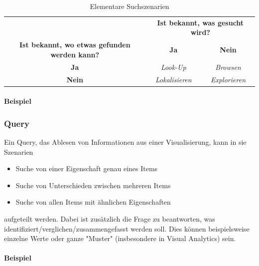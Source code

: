 				\begin{table}
					\centering
					\begin{tabular}{c|cc}
						\toprule
						                                                     & \multicolumn{2}{c}{\textbf{Ist bekannt, was gesucht wird?}} \\
						\textbf{Ist bekannt, wo etwas gefunden werden kann?} & \textbf{Ja}         & \textbf{Nein}                         \\ \midrule
						\textbf{Ja}                                          & \emph{Look-Up}      & \emph{Browsen}                        \\
						\textbf{Nein}                                        & \emph{Lokalisieren} & \emph{Explorieren}                    \\ \bottomrule
					\end{tabular}
					\caption{Elementare Suchszenarien}
					\label{tab:suche}
				\end{table}

				\paragraph{Beispiel}

			\subsubsection{Query}
				Ein Query, \dh das Ablesen von Informationen aus einer Visualisierung, kann in sie Szenarien
				\begin{itemize}
					\item {} Suche von einer Eigenschaft genau eines Items
					\item {}    Suche von Unterschieden zwischen mehreren Items
					\item {} Suche von allen Items mit ähnlichen Eigenschaften
				\end{itemize}
				aufgeteilt werden. Dabei ist zusätzlich die Frage zu beantworten, was identifiziert/verglichen/zusammengefasst werden soll. Dies können beispielsweise einzelne Werte oder ganze "Muster" (insbesondere in Visual Analytics) sein.

				\paragraph{Beispiel}

